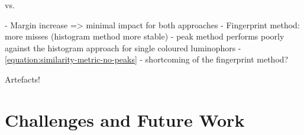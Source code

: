 \documentclass[thesis.tex]{subfiles}
\begin{document}
vs.

- Margin increase => minimal impact for both approaches
- Fingerprint method: more misses (histogram method more stable)
- peak method performs poorly against the histogram approach for single coloured luminophors
- \ref{equation:similarity-metric-no-peaks} - shortcoming of the fingerprint method?

Artefacts!

\section{Challenges and Future Work}
\begin{comment}
Color calibration

There are mainly two modules responsible for the color-rendering accuracy of a digital camera: the former is the illuminant estimation and correction module, and the latter is the color matrix transformation aimed to adapt the color response of the sensor to a standard color space. These two modules together form what may be called the color correction pipeline.

RGB is a device-dependent color model: different devices detect or reproduce a given RGB value differently, since the color elements (such as phosphors or dyes) and their response to the individual R, G, and B levels vary from manufacturer to manufacturer, or even in the same device over time. Thus an RGB value does not define the same color across devices without some kind of color management.
\url{http://www.cis.rit.edu/~jxj1770/publications/paperEI_Xerox.pdf}
\url{http://www.cs.unc.edu/techreports/04-012.pdf}


\end{comment}
\end{document}
